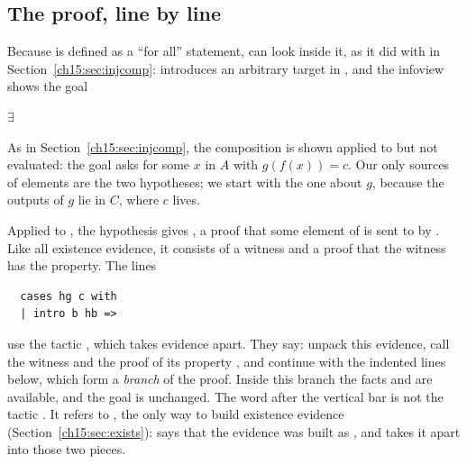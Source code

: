 \subsection*{The proof, line by line}
Because  is defined as a ``for all'' statement,  can look inside it, as it did with  in Section~\ref{ch15:sec:injcomp}:  introduces an arbitrary target  in , and the infoview shows the goal
\begin{center}
$\exists$\,
\end{center}
As in Section~\ref{ch15:sec:injcomp}, the composition is shown applied to  but not evaluated: the goal asks for some $x$ in $A$ with $g(f(x))=c$. Our only sources of elements are the two hypotheses; we start with the one about $g$, because the outputs of $g$ lie in $C$, where $c$ lives.

Applied to , the hypothesis  gives , a proof that some element of  is sent to  by . Like all existence evidence, it consists of a witness and a proof that the witness has the property. The lines
\par\noindent\begin{minipage}{\linewidth}
\begin{lstlisting}
  cases hg c with
  | intro b hb =>
\end{lstlisting}
\end{minipage}\par
use the tactic , which takes evidence apart. They say: unpack this evidence, call the witness  and the proof of its property , and continue with the indented lines below, which form a \emph{branch} of the proof. Inside this branch the facts  and  are available, and the goal is unchanged. The word  after the vertical bar is not the tactic . It refers to , the only way to build existence evidence (Section~\ref{ch15:sec:exists}):  says that the evidence was built as , and takes it apart into those two pieces.

